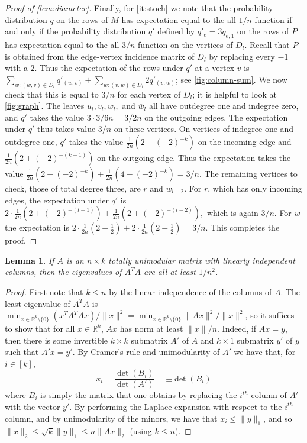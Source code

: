 \documentclass[10pt,a4paper]{article}
\newtheorem{lem}[thm]{Lemma}\crefname{lem}{Lemma}{Lemmas}
\numberwithin{equation}{section}
\newcommand{\RR}{\mathbb R}
\begin{document}
\begin{proof}[Proof of \cref{lem:diameter}]
Finally, for \cref{it:stoch} we note that the probability distribution $q$ on the rows of $M$ has expectation equal to the all $1/n$ function if and only if the probability distribution $q'$ defined by $q'_e = 3q_{e, 1}$ on the rows of $P$ has expectation equal to the all $3/n$ function on the vertices of $D_l$. Recall that $P$ is obtained from the edge-vertex incidence matrix of $D_l$ by replacing every $-1$ with a $2$. Thus the expectation of the rows under $q'$ at a vertex $v$ is $\sum_{w: (w,v) \in D_l} q'_{(w,v)} + \sum_{w: (v,w) \in D_l} 2q'_{(v,w)}$; see \cref{fig:column-sum}. We now check that this is equal to $3/n$ for each vertex of $D_l$; it is helpful to look at \cref{fig:graph}. The leaves $u_l, v_l, w_l,$ and $\overline{w}_l$ all have outdegree one and indegree zero, and $q'$ takes the value $3 \cdot 3/6n = 3/2 n$ on the outgoing edges. The expectation under $q'$ thus takes value $3/n$ on these vertices. On vertices of indegree one and outdegree one, $q'$ takes the value $\frac{1}{2n} \left(2 + (-2)^{- k}\right)$ on the incoming edge and $\frac{1}{2n} \left(2 + (-2)^{- (k+1)}\right)$ on the outgoing edge. Thus the expectation takes the value $\frac{1}{2n} \left(2 + (-2)^{- k}\right) + \frac{1}{2n} \left(4 - (-2)^{- k}\right) = 3/n.$ The remaining vertices to check, those of total degree three, are $r$ and $w_{l-2}$. For $r$, which has only incoming edges, the expectation under $q'$ is $2\cdot \frac{1}{2n} \left(2 + (-2)^{- (l-1)}\right) + \frac{1}{2n} \left(2 + (-2)^{- (l-2)}\right),$ which is again $3/n$. For $w$ the expectation is $2\cdot \frac{1}{2n} \left(2 -\frac{1}{2}\right) + 2\cdot \frac{1}{2n} \left(2 -\frac{1}{2}\right) = 3/n.$ This completes the proof. \end{proof}



\begin{lem}\label{lem:unimod_sing}
If $A$ is an $n \times k$ totally unimodular matrix with linearly independent columns, then the eigenvalues of $A^T A$ are all at least $1/n^2$. 

\end{lem}

\begin{proof} First note that $k \leq n$ by the linear independence of the columns of $A$. The least eigenvalue of $A^T A$ is $\min_{x \in \RR^k\setminus \{0\}} (x^T A^T A x)/\|x\|^2 = \min_{x \in \RR^k\setminus \{0\}} \|Ax\|^2/\|x\|^2$, so it suffices to show that for all $x \in \RR^k$, $A x$ has norm at least $\|x\|/n$. Indeed, if $Ax = y$, then there is some invertible $k\times k$ submatrix $A'$ of $A$ and $k \times 1$ submatrix $y'$ of $y$ such that $A'x = y'$. By Cramer's rule and unimodularity of $A'$ we have that, for $i \in [k]$,
	$$ x_i = \dfrac{\det(B_i)}{\det(A')} = \pm \det(B_i)$$
	where $B_i$ is simply the matrix that one obtains by replacing the $i^{th}$ column of $A'$ with the
	vector $y'$. By performing the Laplace expansion with respect to the $i^{th}$ column, and by unimodularity of the
	minors, we have that $x_i \leq \|y\|_1$, and so $\|x\|_2 \leq \sqrt{k} \|y\|_1 \leq n \|Ax\|_2$ (using $k \leq n$).
\end{proof}
\end{document}
